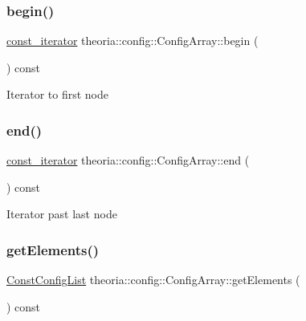 \subsubsection{\texorpdfstring{begin()}{begin()}}
{\footnotesize\ttfamily \hyperlink{classtheoria_1_1config_1_1ConfigArray_ace80948768681e7eb033825f4fe761f2}{const\+\_\+iterator} theoria\+::config\+::\+Config\+Array\+::begin (\begin{DoxyParamCaption}{ }\end{DoxyParamCaption}) const\hspace{0.3cm}{\ttfamily [inline]}}

Iterator to first node \mbox{\label{classtheoria_1_1config_1_1ConfigArray_a5fca8609f50e2cfc41d75b0d6891c415}} 
\subsubsection{\texorpdfstring{end()}{end()}}
{\footnotesize\ttfamily \hyperlink{classtheoria_1_1config_1_1ConfigArray_ace80948768681e7eb033825f4fe761f2}{const\+\_\+iterator} theoria\+::config\+::\+Config\+Array\+::end (\begin{DoxyParamCaption}{ }\end{DoxyParamCaption}) const\hspace{0.3cm}{\ttfamily [inline]}}

Iterator past last node \mbox{\label{classtheoria_1_1config_1_1ConfigArray_a91bf929f72cc8eeb399df049c5008898}} 
\subsubsection{\texorpdfstring{get\+Elements()}{getElements()}\hspace{0.1cm}{\footnotesize\ttfamily [1/2]}}
{\footnotesize\ttfamily \hyperlink{classtheoria_1_1config_1_1Config_a61230728ffa4d92667a536c8c0f0ca30}{Const\+Config\+List} theoria\+::config\+::\+Config\+Array\+::get\+Elements (\begin{DoxyParamCaption}{ }\end{DoxyParamCaption}) const\hspace{0.3cm}{\ttfamily [inline]}}

